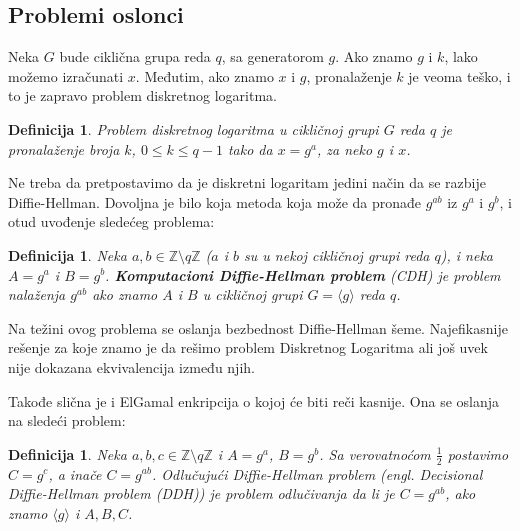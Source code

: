 \documentclass[a4paper]{article}
\newtheorem{defn}[primer]{Definicija}
\begin{document}
\subsection{Problemi oslonci}
\label{subsec:problemi_oslonci}

Neka $G$ bude ciklična grupa reda $q$, sa generatorom $g$. %
Ako znamo $g$ i $k$, lako možemo izračunati $x$. Međutim, ako znamo $x$ i $g$, pronalaženje $k$ je veoma teško, 
i to je zapravo problem diskretnog logaritma.

\begin{defn}
Problem diskretnog logaritma u cikličnoj grupi $G$ reda $q$ je pronalaženje broja $k$, $0 \leq k \leq q - 1$ 
tako da $x = g^a$, za neko $g$ i $x$.
\end{defn}


Ne treba da pretpostavimo da je diskretni logaritam jedini način da se razbije Diffie-Hellman. 
Dovoljna je bilo koja metoda koja može da pronađe $g^{ab}$ iz $g^a$ i $g^b$, i otud uvođenje sledećeg problema:

\begin{defn}
    Neka $a,b\in \mathbb{Z}\setminus q\mathbb{Z}$ ($a$ i $b$ su u nekoj cikličnoj grupi reda $q$),
    i neka $A = g^a$ i $B = g^b$.
    \textbf{Komputacioni Diffie-Hellman problem} (CDH) je problem nalaženja $g^{ab}$ ako znamo $A$ i $B$ u cikličnoj grupi
    $G = \langle g \rangle$ reda $q$.
\end{defn}

Na težini ovog problema se oslanja bezbednost Diffie-Hellman šeme.
Najefikasnije rešenje za koje znamo je da rešimo problem Diskretnog Logaritma 
ali još uvek nije dokazana ekvivalencija između njih. \cite{dlproblem}

Takođe slična je i ElGamal enkripcija o kojoj će biti reči kasnije. Ona se oslanja na sledeći problem:

\begin{defn}
    Neka $a,b,c\in \mathbb{Z}\setminus q\mathbb{Z}$ i $A = g^a$, $B = g^b$. Sa verovatnoćom $\frac{1}{2}$ postavimo $C = g^c$, 
    a inače $C = g^{ab}$. Odlučujući Diffie-Hellman problem (engl. \emph{Decisional Diffie-Hellman problem (DDH)}) je problem
    odlučivanja da li je $C = g^{ab}$, ako znamo $\langle g \rangle$ i $A, B, C$.
\end{defn}
\end{document}
